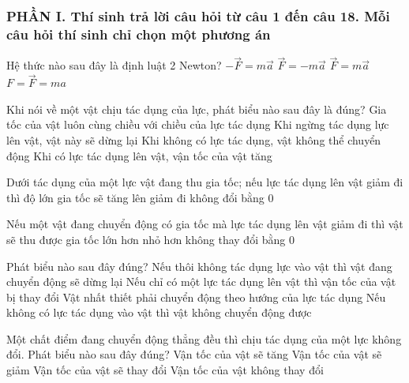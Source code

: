 \subsubsection*{PHẦN I. Thí sinh trả lời câu hỏi từ câu 1 đến câu 18. Mỗi câu hỏi thí sinh chỉ chọn một phương án}
\setcounter{ex}{0}
\begin{ex}%
Hệ thức nào sau đây là định luật 2 Newton?
\choice
{$-\vec F = m\vec a$}
{$\vec F = - m\vec a$}
{\True $\vec F = m\vec a$}
{$F=\vec F = ma$}
 \end{ex}
\begin{ex}%
Khi nói về một vật chịu tác dụng của lực, phát biểu nào sau đây là đúng?
\choice
{\True Gia tốc của vật luôn cùng chiều với chiều của lực tác dụng}
{Khi ngừng tác dụng lực lên vật, vật này sẽ dừng lại}
{Khi không có lực tác dụng, vật không thể chuyển động}
{Khi có lực tác dụng lên vật, vận tốc của vật tăng}
 \end{ex}
\begin{ex}%
Dưới tác dụng của một lực vật đang thu gia tốc; nếu lực tác dụng lên vật giảm đi thì độ lớn gia tốc sẽ
\choice
{tăng lên}
{\True giảm đi}
{không đổi}
{bằng $0$}
 \end{ex}
\begin{ex}%
Nếu một vật đang chuyển động có gia tốc mà lực tác dụng lên vật giảm đi thì vật sẽ thu được gia tốc
\choice
{lớn hơn}
{\True nhỏ hơn}
{không thay đổi}
{bằng $0$}
 \end{ex}
\begin{ex}%
Phát biểu nào sau đây đúng?
\choice
{Nếu thôi không tác dụng lực vào vật thì vật đang chuyển động sẽ dừng lại}
{\True Nếu chỉ có một lực tác dụng lên vật thì vận tốc của vật bị thay đổi}
{Vật nhất thiết phải chuyển động theo hướng của lực tác dụng}
{Nếu không có lực tác dụng vào vật thì vật không chuyển động được}
  \end{ex}
\begin{ex}%
Một chất điểm đang chuyển động thẳng đều thì chịu tác dụng của một lực không đổi. Phát biểu nào sau đây đúng?
\choice
{Vận tốc của vật sẽ tăng}
{Vận tốc của vật sẽ giảm}
{\True Vận tốc của vật sẽ thay đổi}
{Vận tốc của vật không thay đổi}
  \end{ex}
